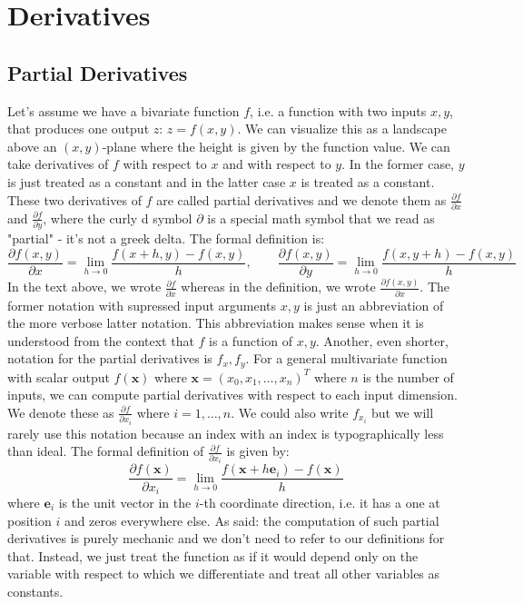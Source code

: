\section{Derivatives}

\subsection{Partial Derivatives}
Let's assume we have a bivariate function $f$, i.e. a function with two inputs $x,y$, that produces one output $z$: $z = f(x,y)$. We can visualize this as a landscape above an $(x,y)$-plane where the height is given by the function value. We can take derivatives of $f$ with respect to $x$ and with respect to $y$. In the former case, $y$ is just treated as a constant and in the latter case $x$ is treated as a constant. These two derivatives of $f$ are called partial derivatives and we denote them as $\frac{\partial f}{\partial x}$ and $\frac{\partial f}{\partial y}$, where the curly d symbol $\partial$ is a special math symbol that we read as "partial" - it's not a greek delta. The formal definition is:
\begin{equation}
 \frac{\partial f(x,y)}{\partial x} = \lim_{h \rightarrow 0} \frac{f(x+h,y) - f(x,y)}{h}, \qquad
 \frac{\partial f(x,y)}{\partial y} = \lim_{h \rightarrow 0} \frac{f(x,y+h) - f(x,y)}{h}
\end{equation}
In the text above, we wrote $\frac{\partial f}{\partial x}$ whereas in the definition, we wrote  $\frac{\partial f(x,y)}{\partial x}$. The former notation with supressed input arguments $x,y$ is just an abbreviation of the more verbose latter notation. This abbreviation makes sense when it is understood from the context that $f$ is a function of $x,y$. Another, even shorter, notation for the partial derivatives is $f_x, f_y$. For a general multivariate function with scalar output $f(\mathbf{x})$ where $\mathbf{x} = (x_0,x_1,\ldots,x_n)^T$ where $n$ is the number of inputs, we can compute partial derivatives with respect to each input dimension. We denote these as $\frac{\partial f}{\partial x_i}$ where $i = 1,\ldots,n$. We could also write $f_{x_i}$ but we will rarely use this notation because an index with an index is typographically less than ideal. The formal definition of $\frac{\partial f}{\partial x_i}$ is given by:
\begin{equation}
 \frac{\partial f(\mathbf{x}) }{\partial x_i} 
 = \lim_{h \rightarrow 0} \frac{f(\mathbf{x} + h \mathbf{e}_i ) - f(\mathbf{x})}{h}
\end{equation}
where $\mathbf{e}_i$ is the unit vector in the $i$-th coordinate direction, i.e. it has a one at position $i$ and zeros everywhere else. As said: the computation of such partial derivatives is purely mechanic and we don't need to refer to our definitions for that. Instead, we just treat the function as if it would depend only on the variable with respect to which we differentiate and treat all other variables as constants.

